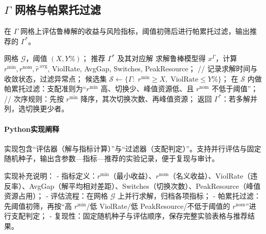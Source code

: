 \clearpage

\subsection{\texorpdfstring{$\Gamma$}{Gamma} 网格与帕累托过滤}
在 $\Gamma$ 网格上评估鲁棒解的收益与风险指标，阈值初筛后进行帕累托过滤，输出推荐的 $\Gamma^*$。
\begin{algorithm}[H]
  \caption{\texorpdfstring{$\Gamma$}{Gamma} 网格与帕累托过滤}
  \label{lst:gamma-grid}
  \begin{algorithmic}[1]
    \Require 网格 $\mathcal{G}$，阈值 $(X, Y\%)$；
    \Ensure 推荐 $\Gamma^*$ 及其对应解
      \State 求解鲁棒模型得 $x^\Gamma$，计算 $r^{\min}, r^{\mathrm{nom}}, \widehat r^{\,\mathrm{avg}}$, ViolRate, AvgGap, Switches, PeakResource；
      \State // 记录求解时间与收敛状态，过滤异常点；
    \EndFor
    \State 候选集 $\mathcal{S} \gets \{\Gamma:\; r^{\min}\ge X,\; \text{ViolRate}\le Y\%\}$；
    \State 在 $\mathcal{S}$ 内做帕累托过滤：支配准则为“$r^{\min}$ 高、切换少、峰值资源低、且 $r^{\mathrm{nom}}$ 不低于阈值”；
    \State // 次序规则：先按 $r^{\min}$ 降序，其次切换次数、再峰值资源；
    \State 返回 $\Gamma^*$：若多解并列，选切换更少者。
  \end{algorithmic}
\end{algorithm}
\paragraph{Python实现阐释}
实现包含“评估器（解与指标计算）”与“过滤器（支配判定）”。支持并行评估与固定随机种子，输出含参数—指标—推荐的实验记录，便于复现与审计。

实现补充说明：
- 指标定义：$r^{\min}$（最小收益）、$r^{\mathrm{nom}}$（名义收益）、ViolRate（违反率）、AvgGap（解平均相对差距）、Switches（切换次数）、PeakResource（峰值资源占用）；
- 评估流程：在网格 $\mathcal G$ 上并行求解，归档各项指标；
- 帕累托过滤：先阈值初筛，再按“高 $r^{\min}$/低 ViolRate/低 PeakResource/不低于阈值的 $r^{\mathrm{nom}}$”进行支配判定；
- 复现性：固定随机种子与评估顺序，保存完整实验表格与推荐结果。

\newpage

\begin{center}
\begin{minipage}[t][\dimexpr\textheight-1em\relax]{0.98\linewidth}

\end{minipage}
\end{center}

